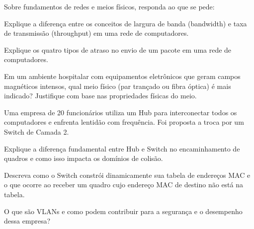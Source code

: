 \documentclass[11pt, addpoints]{modelo/prova2}
\begin{document}
\maketitle 
\question[1.5] Sobre fundamentos de redes e meios físicos, responda ao que se pede:
\begin{choices}
    \item Explique a diferença entre os conceitos de largura de banda (bandwidth) e taxa de transmissão (throughput) em uma rede de computadores. 
    \item Explique os quatro tipos de atraso no envio de um pacote em uma rede de computadores.
    \item Em um ambiente hospitalar com equipamentos eletrônicos que geram campos magnéticos intensos, qual meio físico (par trançado ou fibra óptica) é mais indicado? Justifique com base nas propriedades físicas do meio. 
\end{choices}
\question[2] Uma empresa de 20 funcionários utiliza um Hub para interconectar todos os computadores e enfrenta lentidão com frequência. Foi proposta a troca por um Switch de Camada 2.
\begin{choices}
    \item Explique a diferença fundamental entre Hub e Switch no encaminhamento de quadros e como isso impacta os domínios de colisão.
    \item Descreva como o Switch constrói dinamicamente sua tabela de endereços MAC e o que ocorre ao receber um quadro cujo endereço MAC de destino não está na tabela. 
    \item O que são VLANs e como podem contribuir para a segurança e o desempenho dessa empresa?
\end{choices}
\end{document}
